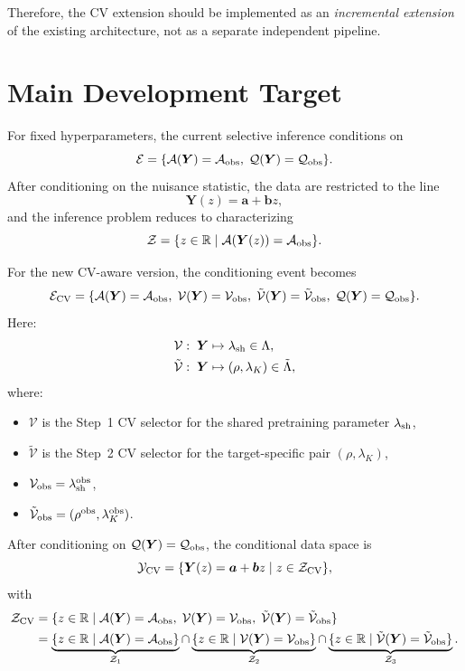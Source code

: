 \documentclass[11pt]{article}
\begin{document}
Therefore, the CV extension should be implemented as an \emph{incremental extension} of the existing architecture, not as a separate independent pipeline.

\section{Main Development Target}
For fixed hyperparameters, the current selective inference conditions on
\[
\mathcal{E} = \{\mathcal{A}(\bm{Y}) = \mathcal{A}_{\rm obs},\; \mathcal{Q}(\bm{Y}) = \mathcal{Q}_{\rm obs}\}.
\]
After conditioning on the nuisance statistic, the data are restricted to the line
\[
\bm{Y}(z) = \bm{a} + \bm{b}z,
\]
and the inference problem reduces to characterizing
\[
\mathcal{Z} = \{ z \in \mathbb{R} \mid \mathcal{A}(\bm{Y}(z)) = \mathcal{A}_{\rm obs} \}.
\]

For the new CV-aware version, the conditioning event becomes
\[
\mathcal{E}_{\rm CV} = \{ \mathcal{A}(\bm{Y}) = \mathcal{A}_{\rm obs},\; \mathcal{V}(\bm{Y}) = \mathcal{V}_{\rm obs},\; \tilde{\mathcal{V}}(\bm{Y}) = \tilde{\mathcal{V}}_{\rm obs},\; \mathcal{Q}(\bm{Y}) = \mathcal{Q}_{\rm obs} \}.
\]
Here:
\begin{align*}
    \mathcal{V}:\; \bm{Y} &\mapsto \lambda_{\rm sh} \in \Lambda, \\
    \tilde{\mathcal{V}}:\; \bm{Y} &\mapsto (\rho, \lambda_K) \in \tilde{\Lambda},
\end{align*}
where:
\begin{itemize}[leftmargin=2em]
    \item $\mathcal{V}$ is the Step~1 CV selector for the shared pretraining parameter $\lambda_{\rm sh}$,
    \item $\tilde{\mathcal{V}}$ is the Step~2 CV selector for the target-specific pair $(\rho, \lambda_K)$,
    \item $\mathcal{V}_{\rm obs} = \lambda_{\rm sh}^{\rm obs}$,
    \item $\tilde{\mathcal{V}}_{\rm obs} = (\rho^{\rm obs}, \lambda_K^{\rm obs})$.
\end{itemize}

After conditioning on $\mathcal{Q}(\bm{Y}) = \mathcal{Q}_{\rm obs}$, the conditional data space is
\[
\mathcal{Y}_{\rm CV} = \{ \bm{Y}(z) = \bm{a} + \bm{b}z \mid z \in \mathcal{Z}_{\rm CV} \},
\]
with
\begin{align*}
    \mathcal{Z}_{\rm CV}
    &= \{ z \in \mathbb{R} \mid \mathcal{A}(\bm{Y}) = \mathcal{A}_{\rm obs},\; \mathcal{V}(\bm{Y}) = \mathcal{V}_{\rm obs},\; \tilde{\mathcal{V}}(\bm{Y}) = \tilde{\mathcal{V}}_{\rm obs} \} \\
    &= \underbrace{\{ z \in \mathbb{R} \mid \mathcal{A}(\bm{Y}) = \mathcal{A}_{\rm obs} \}}_{\mathcal{Z}_1}
    \cap
    \underbrace{\{ z \in \mathbb{R} \mid \mathcal{V}(\bm{Y}) = \mathcal{V}_{\rm obs} \}}_{\mathcal{Z}_2}
    \cap
    \underbrace{\{ z \in \mathbb{R} \mid \tilde{\mathcal{V}}(\bm{Y}) = \tilde{\mathcal{V}}_{\rm obs} \}}_{\mathcal{Z}_3}.
\end{align*}
\end{document}
